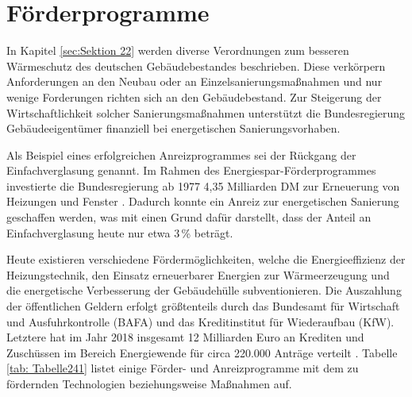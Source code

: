 \section{Förderprogramme}
\label{sec:Sektion 24}

In Kapitel \ref{sec:Sektion 22} werden diverse Verordnungen zum besseren Wärmeschutz des deutschen Gebäudebestandes beschrieben.
Diese verkörpern Anforderungen an den Neubau oder an Einzelsanierungsmaßnahmen und nur wenige Forderungen richten sich an den Gebäudebestand.
Zur Steigerung der Wirtschaftlichkeit solcher Sanierungsmaßnahmen unterstützt die Bundesregierung Gebäudeeigentümer finanziell bei energetischen Sanierungsvorhaben.

Als Beispiel eines erfolgreichen Anreizprogrammes sei der Rückgang der Einfachverglasung genannt.
Im Rahmen des Energiespar-Förderprogrammes investierte die Bundesregierung ab 1977 4,35 Milliarden DM zur Erneuerung von Heizungen und Fenster \cite{EickeHenning.2011b}.
Dadurch konnte ein Anreiz zur energetischen Sanierung geschaffen werden, was mit einen Grund dafür darstellt, dass der Anteil an Einfachverglasung heute nur etwa 3\,\% beträgt.

Heute existieren verschiedene Fördermöglichkeiten, welche die Energieeffizienz der Heizungstechnik, den Einsatz erneuerbarer Energien zur Wärmeerzeugung und die energetische Verbesserung der Gebäudehülle subventionieren.
Die Auszahlung der öffentlichen Geldern erfolgt größtenteils durch das Bundesamt für Wirtschaft und Ausfuhrkontrolle (BAFA) und das Kreditinstitut für Wiederaufbau (KfW).
Letztere hat im Jahr 2018 insgesamt 12 Milliarden Euro an Krediten und Zuschüssen im Bereich Energiewende für circa 220.000 Anträge verteilt \cite{KfW_Report18}. 
Tabelle \ref{tab: Tabelle241} listet einige Förder- und Anreizprogramme mit dem zu fördernden Technologien beziehungsweise Maßnahmen auf.


